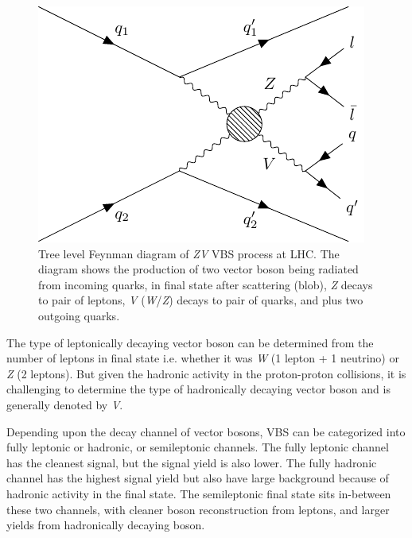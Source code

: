 \begin{figure}[!ht]
  \centering
  \begin{minipage}{0.5\textwidth}
    \includegraphics[width=\textwidth]{figures/feyn_vbs_0.pdf}
    \vspace{5pt}
  \end{minipage}
  \caption[Tree level Feynman diagram of \textit{ZV} VBS process at LHC]%
  {Tree level Feynman diagram of \textit{ZV} VBS process at LHC\@. The diagram
    shows the production of two vector boson being radiated from incoming
    quarks, in final state after scattering (blob), \textit{Z} decays
    to pair of leptons, \textit{V} (\textit{W}/\textit{Z}) decays to pair of quarks,
    and plus two outgoing quarks.
  }%
  \label{fig:feynman-vbs}
\end{figure}

The type of leptonically decaying
vector boson can be determined from the number of leptons in final state i.e.
whether it was \textit{W} (1 lepton + 1 neutrino) or \textit{Z} (2 leptons).
But given the hadronic activity
in the proton-proton collisions, it is challenging
to determine the type of hadronically decaying vector
boson and is generally denoted by \textit{V}.

Depending upon the decay channel of vector bosons, \gls{VBS} can
be categorized into fully leptonic or hadronic, or semileptonic channels.
The fully leptonic channel has the cleanest signal, but the signal yield
is also lower. The fully hadronic channel has the highest
signal yield but also have large background because of hadronic activity
in the final state.
The semileptonic final state sits in-between these two channels,
with cleaner boson reconstruction from leptons, and larger yields
from hadronically decaying boson.

